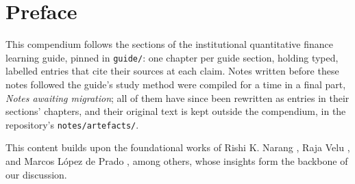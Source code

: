 \chapter{Preface}

This compendium follows the sections of the institutional quantitative finance learning guide, pinned in \texttt{guide/}: one chapter per guide section, holding typed, labelled entries that cite their sources at each claim. Notes written before these notes followed the guide's study method were compiled for a time in a final part, \emph{Notes awaiting migration}; all of them have since been rewritten as entries in their sections' chapters, and their original text is kept outside the compendium, in the repository's \texttt{notes/artefacts/}.

This content builds upon the foundational works of Rishi K. Narang \citep{s7-narang}, Raja Velu \citep{s3-velu}, and Marcos L\'opez de Prado \citep{alpha-afml}, among others, whose insights form the backbone of our discussion.
